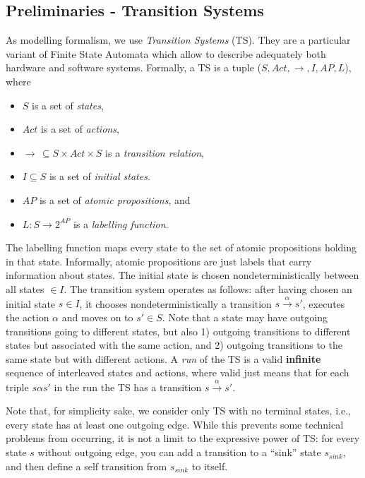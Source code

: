 \documentclass{article}
\begin{document}
\subsection{Preliminaries - Transition Systems}
\label{subsec-ts}
As modelling formalism, we use \emph{Transition Systems} (TS). They are a particular variant 
of Finite State Automata which allow to describe adequately both hardware and software systems. 
Formally, a TS is a tuple ($S, Act, \rightarrow, I, AP, L$), where 
\begin{itemize}
    \item $S$ is a set of \emph{states},
    \item $Act$ is a set of \emph{actions},
    \item $\rightarrow\,\subseteq S \times Act \times S$ is a \emph{transition relation},
    \item $I \subseteq S$ is a set of \emph{initial states}.
    \item $AP$ is a set of \emph{atomic propositions}, and 
    \item $L : S \rightarrow 2^{AP}$ is a \emph{labelling function}.
\end{itemize}
The labelling function maps every state to the set of atomic propositions holding in that state. 
Informally, atomic propositions are just labels that carry information about states.
The initial state is chosen nondeterministically between all states $\in I$.
The transition system operates as follows: after having chosen an initial state $s \in I$, it chooses 
nondeterministically a transition $s \xrightarrow{\alpha} s'$, 
executes the action $\alpha$ and moves on to $s' \in S$. Note that a state may have outgoing transitions 
going to different states, but also 1) outgoing transitions to different states but associated with the same action, and
2) outgoing transitions to the same state but with different actions.
A \emph{run} of the TS is a valid \textbf{infinite} sequence of interleaved states and actions,
where valid just means that for each triple $s \alpha s'$ in the run the TS has a transition $s \xrightarrow{\alpha} s'$.

Note that, for simplicity sake, we consider only TS with no terminal states, i.e., 
every state has at least one outgoing edge. 
While this prevents some technical problems from occurring, 
it is not a limit to the expressive power of TS: for every state $s$ without outgoing edge, 
you can add a transition to a ``sink'' state $s_ {sink}$, 
and then define a self transition from $s_ {sink}$ to itself.
\end{document}
